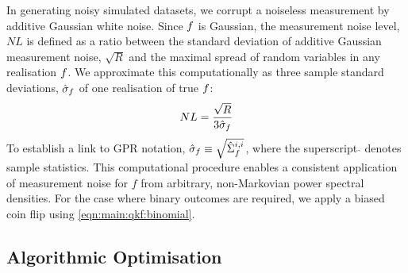 \documentclass[pra, reprint]{revtex4-1}
\begin{document}
In generating noisy simulated datasets, we corrupt a noiseless measurement by additive Gaussian white noise. Since $f$ is Gaussian, the measurement noise level, $NL$ is defined as a ratio between the standard deviation of additive Gaussian measurement noise, $\sqrt{R}$ and the maximal spread of random variables in any realisation $f$. We approximate this computationally as three sample standard deviations, $\hat{\sigma}_f$ of one realisation of true $f$:
\begin{align}
NL = \frac{\sqrt{R}}{3\hat{\sigma}_f}
\end{align}
To establish a link to GPR notation, $\hat{\sigma}_f \equiv \sqrt{\hat{\Sigma}_f^{i,i}}$, where the superscript $\hat{}$ denotes sample statistics. This computational procedure enables a consistent application of measurement noise for $f$ from arbitrary, non-Markovian power spectral densities. For the case where binary outcomes are required, we apply a biased coin flip using \cref{eqn:main:qkf:binomial}.










\subsection{Algorithmic Optimisation \label{sec:main:Optimisation}}
\end{document}
